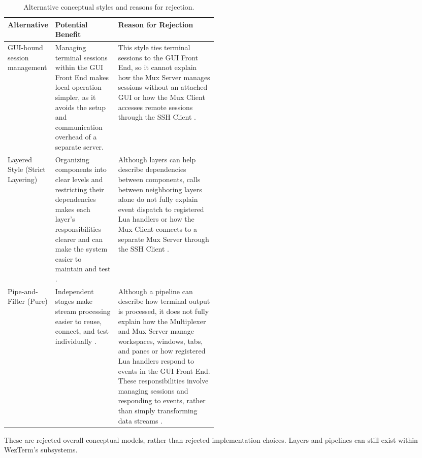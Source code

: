 \begin{table}[!htbp]
  \centering
  \caption{Alternative conceptual styles and reasons for rejection.}
  \label{tab:architectural-alternatives}
  \begin{tabularx}{\linewidth}{@{}>{\raggedright\arraybackslash}p{0.18\linewidth}>{\raggedright\arraybackslash}p{0.30\linewidth}>{\raggedright\arraybackslash}X@{}}
    \toprule
    \textbf{Alternative} & \textbf{Potential Benefit} & \textbf{Reason for Rejection} \\
    \midrule
    GUI-bound session management & Managing terminal sessions within the GUI Front End makes local operation simpler, as it avoids the setup and communication overhead of a separate server. & This style ties terminal sessions to the GUI Front End, so it cannot explain how the Mux Server manages sessions without an attached GUI or how the Mux Client accesses remote sessions through the SSH Client \cite{multiplexing,mux-api}. \\
    \addlinespace
    Layered Style (Strict Layering) & Organizing components into clear levels and restricting their dependencies makes each layer's responsibilities clearer and can make the system easier to maintain and test \cite{arch-styles}. & Although layers can help describe dependencies between components, calls between neighboring layers alone do not fully explain event dispatch to registered Lua handlers or how the Mux Client connects to a separate Mux Server through the SSH Client \cite{event-registration,multiplexing}. \\
    \addlinespace
    Pipe-and-Filter (Pure) & Independent stages make stream processing easier to reuse, connect, and test individually \cite{arch-styles}. & Although a pipeline can describe how terminal output is processed, it does not fully explain how the Multiplexer and Mux Server manage workspaces, windows, tabs, and panes or how registered Lua handlers respond to events in the GUI Front End. These responsibilities involve managing sessions and responding to events, rather than simply transforming data streams \cite{mux-api,event-registration}. \\
    \bottomrule
  \end{tabularx}
\end{table}

\FloatBarrier
These are rejected overall conceptual models, rather than rejected implementation choices. Layers and pipelines can still exist within WezTerm's subsystems.